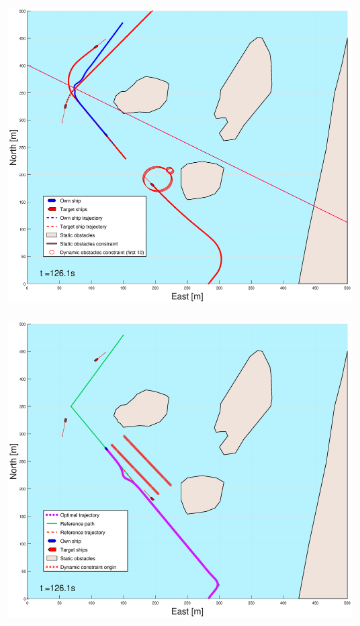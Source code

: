 \begin{figure}[ht]
\begin{subfigure}[b]{0.499\textwidth}
    \end{subfigure}
    \hfill
    \\
    \begin{subfigure}[b]{0.49\textwidth}
        \centering
        \includegraphics[width=\textwidth]{Images/Figures/Helloya_Rev/_Simple_1fig1_time=126}
    \end{subfigure}
    \hfill
    \begin{subfigure}[b]{0.499\textwidth}
        \centering
        \includegraphics[width=\textwidth]{Images/Figures/Helloya_Rev/_Simple_1fig999_time=126}

\end{subfigure}
\end{figure}
